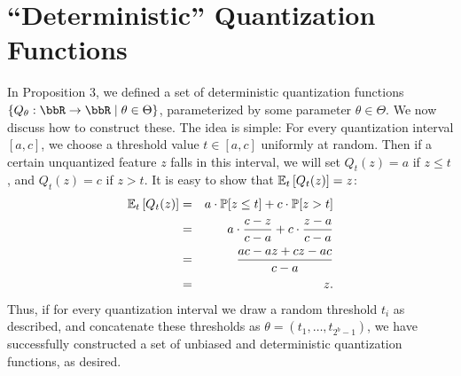 \documentclass[12pt]{article}
\begin{document}
\section{``Deterministic'' Quantization Functions}
In Proposition 3, we defined a set of deterministic quantization functions
$\{Q_{\theta}:\RR\rightarrow\RR \;|\; \theta\in\Theta \}$, parameterized by some parameter $\theta\in\Theta$.
We now discuss how to construct these.  The idea is simple: For every quantization interval $[a,c]$, we choose a threshold value $t \in [a,c]$ uniformly at random.  Then if a certain unquantized feature $z$ falls in this interval, we will set $Q_t(z)= a$ if $z \leq t$, and $Q_t(z) = c$ if $z > t$.  It is easy to show that $\expect{t}{Q_t(z)} = z$:
\begin{eqnarray*}
	\expect{t}{Q_t(z)} &=& a \cdot \Prob[z \leq t] + c \cdot \Prob[z > t]  \\
	&=& a \cdot \frac{c-z}{c-a} + c\cdot \frac{z-a}{c-a} \\
	&=& \frac{ac - az + cz - ac}{c-a} \\
	&=& z.
\end{eqnarray*}
Thus, if for every quantization interval we draw a random threshold $t_i$ as described, and concatenate these thresholds as $\theta = (t_1,\ldots,t_{2^b-1})$, we have successfully constructed a set of unbiased and deterministic quantization functions, as desired.


\end{document}
